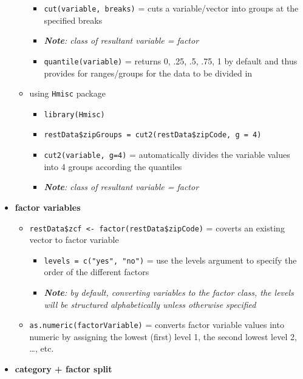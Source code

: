 \documentclass[
]{article}
\providecommand{\tightlist}{%
  \setlength{\itemsep}{0pt}\setlength{\parskip}{0pt}}
\begin{document}
\begin{itemize}
\begin{itemize}
    \begin{itemize}
    \tightlist
    \item
      \texttt{cut(variable,\ breaks)} = cuts a variable/vector into
      groups at the specified breaks
    \item
      \emph{\textbf{Note}: class of resultant variable = factor }
    \item
      \texttt{quantile(variable)} = returns 0, .25, .5, .75, 1 by
      default and thus provides for ranges/groups for the data to be
      divided in
    \end{itemize}
  \item
    using \texttt{Hmisc} package

    \begin{itemize}
    \tightlist
    \item
      \texttt{library(Hmisc)}
    \item
      \texttt{restData\$zipGroups\ =\ cut2(restData\$zipCode,\ g\ =\ 4)}
    \item
      \texttt{cut2(variable,\ g=4)} = automatically divides the variable
      values into 4 groups according the quantiles
    \item
      \emph{\textbf{Note}: class of resultant variable = factor }
    \end{itemize}
  \end{itemize}
\item
  \textbf{factor variables}

  \begin{itemize}
  \tightlist
  \item
    \texttt{restData\$zcf\ \textless{}-\ factor(restData\$zipCode)} =
    coverts an existing vector to factor variable

    \begin{itemize}
    \tightlist
    \item
      \texttt{levels\ =\ c("yes",\ "no")} = use the levels argument to
      specify the order of the different factors
    \item
      \emph{\textbf{Note}: by default, converting variables to the
      factor class, the levels will be structured alphabetically unless
      otherwise specified }
    \end{itemize}
  \item
    \texttt{as.numeric(factorVariable)} = converts factor variable
    values into numeric by assigning the lowest (first) level 1, the
    second lowest level 2, \ldots, etc.
  \end{itemize}
\item
  \textbf{category + factor split}


\end{itemize}
\end{document}
